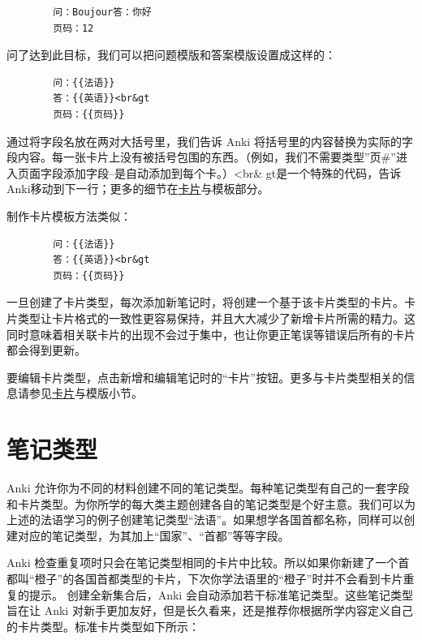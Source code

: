 \documentclass[a4paper]{book}
\begin{document}
	\begin{shaded}\begin{verbatim}
		问：Boujour答：你好
		页码：12
		\end{verbatim}\end{shaded}
	
	问了达到此目标，我们可以把问题模版和答案模版设置成这样的：
	
	\begin{shaded}\begin{verbatim}
		问：{{法语}}
		答：{{英语}}<br&gt
		页码：{{页码}}
		\end{verbatim}\end{shaded}
	
	通过将字段名放在两对大括号里，我们告诉 Anki 将括号里的内容替换为实际的字段内容。每一张卡片上没有被括号包围的东西。（例如，我们不需要类型”页\#”进入页面字段添加字段–是自动添加到每个卡。）<br\& gt是一个特殊的代码，告诉Anki移动到下一行；更多的细节在\hyperref[templates]{卡片}与模板部分。
	
	制作卡片模板方法类似：
	
	\begin{shaded}\begin{verbatim}
		问：{{法语}}
		答：{{英语}}<br&gt
		页码：{{页码}}
		\end{verbatim}\end{shaded}
	
	一旦创建了卡片类型，每次添加新笔记时，将创建一个基于该卡片类型的卡片。卡片类型让卡片格式的一致性更容易保持，并且大大减少了新增卡片所需的精力。这同时意味着相关联卡片的出现不会过于集中，也让你更正笔误等错误后所有的卡片都会得到更新。
	
	要编辑卡片类型，点击新增和编辑笔记时的“卡片”按钮。更多与卡片类型相关的信息请参见\hyperref[templates]{卡片}与模版小节。
	
	\section{笔记类型}
	
	Anki 允许你为不同的材料创建不同的笔记类型。每种笔记类型有自己的一套字段和卡片类型。为你所学的每大类主题创建各自的笔记类型是个好主意。我们可以为上述的法语学习的例子创建笔记类型“法语”。如果想学各国首都名称，同样可以创建对应的笔记类型，为其加上“国家”、“首都”等等字段。
	
	Anki 检查重复项时只会在笔记类型相同的卡片中比较。所以如果你新建了一个首都叫“橙子”的各国首都类型的卡片，下次你学法语里的“橙子”时并不会看到卡片重复的提示。
	创建全新集合后，Anki 会自动添加若干标准笔记类型。这些笔记类型旨在让 Anki 对新手更加友好，但是长久看来，还是推荐你根据所学内容定义自己的卡片类型。标准卡片类型如下所示：
	
\end{document}
